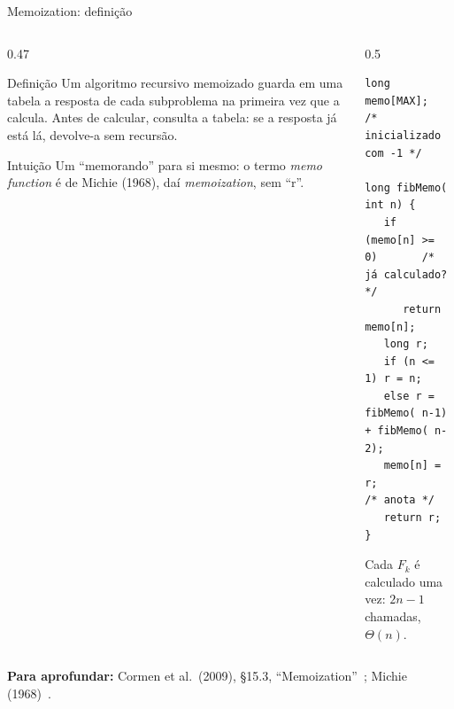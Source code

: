 \documentclass[aspectratio=169,xcolor=table]{beamer}
\newcommand{\fonte}[1]{%
  \vfill
  {\tiny\color{gray!55!black}\textbf{Para aprofundar:} #1\par}%
}
\begin{document}
\begin{frame}[fragile]{Memoization: definição}
  \begin{columns}[T]
    \begin{column}{0.47\textwidth}
      \begin{block}{Definição}
        \scriptsize Um algoritmo recursivo \alert{memoizado} guarda em uma tabela a resposta
        de cada subproblema na primeira vez que a calcula. Antes de calcular, consulta a
        tabela: se a resposta já está lá, devolve-a sem recursão.
      \end{block}
      \begin{exampleblock}{Intuição}
        \scriptsize Um ``memorando'' para si mesmo: o termo \emph{memo function} é de
        Michie (1968), daí \emph{memoization}, sem ``r''.
      \end{exampleblock}
    \end{column}
    \begin{column}{0.5\textwidth}
\begin{lstlisting}
long memo[MAX];  /* inicializado com -1 */

long fibMemo( int n) {
   if (memo[n] >= 0)       /* já calculado? */
      return memo[n];
   long r;
   if (n <= 1) r = n;
   else r = fibMemo( n-1) + fibMemo( n-2);
   memo[n] = r;            /* anota */
   return r;
}
\end{lstlisting}
      \scriptsize Cada $F_k$ é calculado uma vez: $2n-1$ chamadas, $\Theta(n)$.
    \end{column}
  \end{columns}
  \fonte{Cormen et al.\ (2009), \S 15.3, ``Memoization''~\cite{cormen2009introduction};
    Michie (1968)~\cite{michie1968memo}.}
\end{frame}
\end{document}

